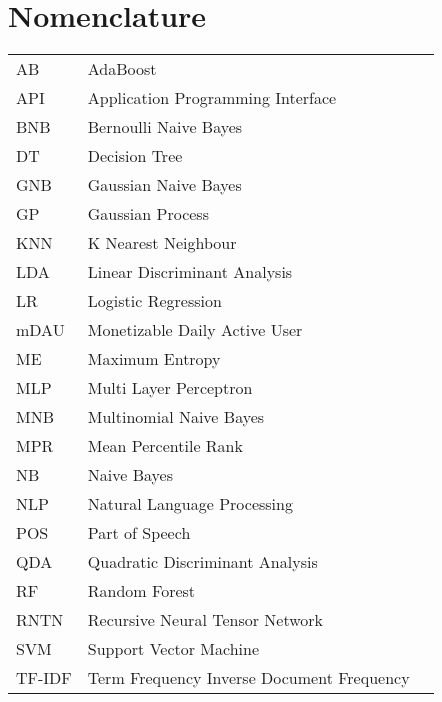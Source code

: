 \chapter*{\Huge{Nomenclature}}
\begin{tabular}{lp{9cm}l}
AB      &   AdaBoost                                \\
API     &   Application Programming Interface       \\
BNB     &   Bernoulli Naive Bayes                   \\
DT      &   Decision Tree                           \\
GNB     &   Gaussian Naive Bayes                    \\
GP      &   Gaussian Process                        \\
KNN     &   K Nearest Neighbour                     \\
LDA     &   Linear Discriminant Analysis            \\
LR      &   Logistic Regression                     \\
mDAU    &   Monetizable Daily Active User           \\
ME      &   Maximum Entropy                         \\
MLP     &   Multi Layer Perceptron                  \\
MNB     &   Multinomial Naive Bayes                 \\
MPR     &   Mean Percentile Rank                    \\
NB      &   Naive Bayes                             \\
NLP     &   Natural Language Processing             \\
POS     &   Part of Speech                          \\
QDA     &   Quadratic Discriminant Analysis         \\
RF      &   Random Forest                           \\
RNTN    &   Recursive Neural Tensor Network         \\
SVM     &   Support Vector Machine                  \\
TF-IDF  &   Term Frequency Inverse Document Frequency \\

\end{tabular}
\vspace{2cm}